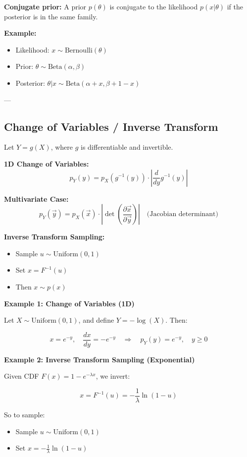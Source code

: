 \textbf{Conjugate prior:} A prior \( p(\theta) \) is conjugate to the likelihood \( p(x|\theta) \) if the posterior is in the same family.

\textbf{Example:}
\begin{itemize}
    \item Likelihood: \( x \sim \text{Bernoulli}(\theta) \)
    \item Prior: \( \theta \sim \text{Beta}(\alpha, \beta) \)
    \item Posterior: \( \theta | x \sim \text{Beta}(\alpha + x, \beta + 1 - x) \)
\end{itemize}

---

\subsection{Change of Variables / Inverse Transform}

Let \( Y = g(X) \), where \( g \) is differentiable and invertible.

\textbf{1D Change of Variables:}
\[
p_Y(y) = p_X(g^{-1}(y)) \cdot \left| \frac{d}{dy} g^{-1}(y) \right|
\]

\textbf{Multivariate Case:}
\[
p_Y(\vec{y}) = p_X(\vec{x}) \cdot 
\left| \det \left( \frac{\partial \vec{x}}{\partial \vec{y}} \right) \right|
\quad \text{(Jacobian determinant)}
\]

\textbf{Inverse Transform Sampling:}

\begin{itemize}
    \item Sample \(u \sim \text{Uniform}(0,1)\)
    \item Set \(x = F^{-1}(u)\)
    \item Then \(x \sim p(x)\)
\end{itemize}

\textbf{Example 1: Change of Variables (1D)}

Let \( X \sim \text{Uniform}(0,1) \), and define \( Y = -\log(X) \). Then:

\[
x = e^{-y}, \quad \frac{dx}{dy} = -e^{-y}
\quad \Rightarrow \quad
p_Y(y) = e^{-y}, \quad y \geq 0
\]

\textbf{Example 2: Inverse Transform Sampling (Exponential)}

Given CDF \( F(x) = 1 - e^{-\lambda x} \), we invert:

\[
x = F^{-1}(u) = -\frac{1}{\lambda} \ln(1 - u)
\]

So to sample:

\begin{itemize}
    \item Sample \(u \sim \text{Uniform}(0,1)\)
    \item Set \(x = -\frac{1}{\lambda} \ln(1 - u)\)
\end{itemize}

